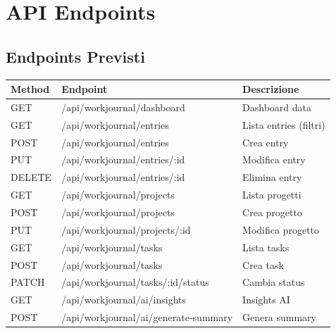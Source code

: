 \documentclass[11pt,a4paper]{article}
\begin{document}

\newpage

\section{API Endpoints}

\subsection{Endpoints Previsti}

\begin{center}
\begin{tabular}{|l|l|l|}
\hline
\textbf{Method} & \textbf{Endpoint} & \textbf{Descrizione} \\
\hline
GET & /api/workjournal/dashboard & Dashboard data \\
GET & /api/workjournal/entries & Lista entries (filtri) \\
POST & /api/workjournal/entries & Crea entry \\
PUT & /api/workjournal/entries/:id & Modifica entry \\
DELETE & /api/workjournal/entries/:id & Elimina entry \\
\hline
GET & /api/workjournal/projects & Lista progetti \\
POST & /api/workjournal/projects & Crea progetto \\
PUT & /api/workjournal/projects/:id & Modifica progetto \\
\hline
GET & /api/workjournal/tasks & Lista tasks \\
POST & /api/workjournal/tasks & Crea task \\
PATCH & /api/workjournal/tasks/:id/status & Cambia status \\
\hline
GET & /api/workjournal/ai/insights & Insights AI \\
POST & /api/workjournal/ai/generate-summary & Genera summary \\
\hline
\end{tabular}
\end{center}


\newpage

\end{document}
